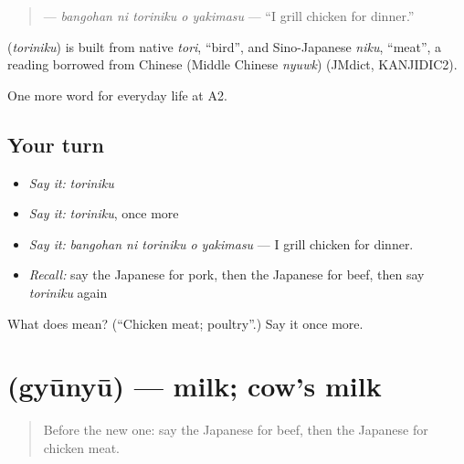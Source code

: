 \begin{quote}
\textbf{  } — \emph{bangohan ni toriniku o yakimasu} — \textquotedblleft{}I grill chicken for dinner.\textquotedblright{}
\end{quote}

\begin{cousinweb}
\textbf{} (\emph{toriniku}) is built from native \emph{tori}, \textquotedblleft{}bird\textquotedblright{}, and Sino-Japanese \emph{niku}, \textquotedblleft{}meat\textquotedblright{}, a reading borrowed from Chinese (Middle Chinese \emph{nyuwk}) (JMdict, KANJIDIC2).
\end{cousinweb}

\begin{grammarlens}[title={What you've built}]
One more word for everyday life at A2.
\end{grammarlens}

\subsection*{Your turn}
\begin{itemize}
\raggedright
  \item \emph{Say it:} \emph{toriniku}
  \item \emph{Say it:} \emph{toriniku}, once more
  \item \emph{Say it:} \emph{bangohan ni toriniku o yakimasu} — I grill chicken for dinner.
  \item \emph{Recall:} say the Japanese for pork, then the Japanese for beef, then say \emph{toriniku} again
\end{itemize}

\begin{tcolorbox}[breakable,colback=teal!4,colframe=teal!35!black,title={Before you move on}]
What does  mean? (\textquotedblleft{}Chicken meat; poultry\textquotedblright{}.) Say it once more.
\end{tcolorbox}
\section[\texorpdfstring{\ja{ぎゅうにゅう} (gyūnyū)}{ぎゅうにゅう (gyūnyū)}]{ (gyūnyū) — milk; cow's milk}

\label{lesson:JA-C178-gyuunyuu}



\begin{quote}
Before the new one: say the Japanese for beef, then the Japanese for chicken meat.
\end{quote}

